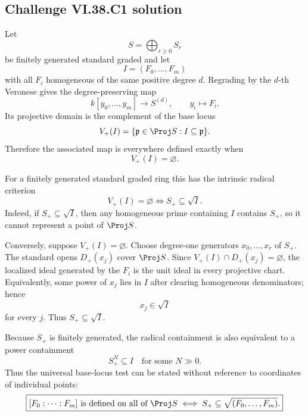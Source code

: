 
\subsection*{Challenge VI.38.C1 solution}
\begin{solution}
Let
\[
S=\bigoplus_{r\ge0}S_r
\]
be finitely generated standard graded and let
\[
I=(F_0,\ldots,F_m)
\]
with all \(F_i\) homogeneous of the same positive degree \(d\).  Regrading by the
\(d\)-th Veronese gives the degree-preserving map
\[
k[y_0,\ldots,y_m]\longrightarrow S^{(d)},
\qquad y_i\longmapsto F_i.
\]
Its projective domain is the complement of the base locus
\[
V_+(I)=\{\mathfrak p\in\Proj S:I\subseteq\mathfrak p\}.
\]
Therefore the associated map is everywhere defined exactly when
\[
V_+(I)=\varnothing.
\]

For a finitely generated standard graded ring this has the intrinsic radical
criterion
\[
\boxed{V_+(I)=\varnothing
\iff
S_+\subseteq\sqrt I}.
\]
Indeed, if \(S_+\subseteq\sqrt I\), then any homogeneous prime containing \(I\)
contains \(S_+\), so it cannot represent a point of \(\Proj S\).

Conversely, suppose \(V_+(I)=\varnothing\). Choose degree-one generators
\(x_0,\ldots,x_r\) of \(S_+\). The standard opens \(D_+(x_j)\) cover \(\Proj S\).
Since \(V_+(I)\cap D_+(x_j)=\varnothing\), the localized ideal generated by the
\(F_i\) is the unit ideal in every projective chart. Equivalently, some power of
\(x_j\) lies in \(I\) after clearing homogeneous denominators; hence
\[
x_j\in\sqrt I
\]
for every \(j\). Thus \(S_+\subseteq\sqrt I\).

Because \(S_+\) is finitely generated, the radical containment is also equivalent
to a power containment
\[
\boxed{S_+^N\subseteq I\quad\text{for some }N\gg0}.
\]
Thus the universal base-locus test can be stated without reference to coordinates
of individual points:
\[
\boxed{
[F_0:\cdots:F_m]\text{ is defined on all of }\Proj S
\iff S_+\subseteq\sqrt{(F_0,\ldots,F_m)}.
}
\]
\end{solution}

